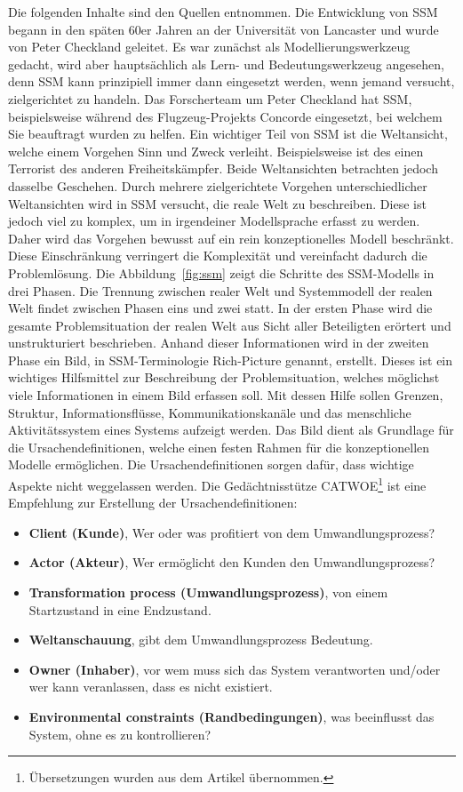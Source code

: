 \documentclass[11pt,a4paper]{report}
\begin{document}
Die folgenden Inhalte sind den Quellen \cite{checkland, bobwill, ssmger} entnommen. Die Entwicklung von SSM begann in den späten 60er Jahren an der Universität von Lancaster und wurde von Peter Checkland geleitet. Es war zunächst als Modellierungswerkzeug gedacht, wird aber hauptsächlich als Lern- und Bedeutungswerkzeug angesehen, denn SSM kann prinzipiell immer dann eingesetzt werden, wenn jemand versucht, zielgerichtet zu handeln. Das Forscherteam um Peter Checkland hat SSM, beispielsweise während des Flugzeug-Projekts Concorde eingesetzt, bei welchem Sie beauftragt wurden zu helfen. Ein wichtiger Teil von SSM ist die Weltansicht, welche einem Vorgehen Sinn und Zweck verleiht. Beispielsweise ist des einen Terrorist des anderen Freiheitskämpfer. Beide Weltansichten betrachten jedoch dasselbe Geschehen. Durch mehrere zielgerichtete Vorgehen unterschiedlicher Weltansichten wird in SSM versucht, die reale Welt zu beschreiben. Diese ist jedoch viel zu komplex, um in irgendeiner Modellsprache erfasst zu werden. Daher wird das Vorgehen bewusst auf ein rein konzeptionelles Modell beschränkt. Diese Einschränkung verringert die Komplexität und vereinfacht dadurch die Problemlösung. Die Abbildung~\ref{fig:ssm} zeigt die Schritte des SSM-Modells in drei Phasen. Die Trennung zwischen realer Welt und Systemmodell der realen Welt findet zwischen Phasen eins und zwei statt. In der ersten Phase wird die gesamte Problemsituation der realen Welt aus Sicht aller Beteiligten erörtert und unstrukturiert beschrieben. Anhand dieser Informationen wird in der zweiten Phase ein Bild, in SSM-Terminologie Rich-Picture genannt, erstellt. Dieses ist ein wichtiges Hilfsmittel zur Beschreibung der Problemsituation, welches möglichst viele Informationen in einem Bild erfassen soll. Mit dessen Hilfe sollen Grenzen, Struktur, Informationsflüsse, Kommunikationskanäle und das menschliche Aktivitätssystem eines Systems aufzeigt werden. Das Bild dient als Grundlage für die Ursachendefinitionen, welche einen festen Rahmen für die konzeptionellen Modelle ermöglichen. Die Ursachendefinitionen sorgen dafür, dass wichtige Aspekte nicht weggelassen werden. Die Gedächtnisstütze CATWOE\footnote{Übersetzungen wurden aus dem Artikel \cite{ssmger} übernommen.} ist eine Empfehlung zur Erstellung der Ursachendefinitionen:

\begin{itemize}[leftmargin=*]
\item \textbf{Client (Kunde)}, Wer oder was profitiert von dem Umwandlungsprozess?
\item \textbf{Actor (Akteur)}, Wer ermöglicht den Kunden den Umwandlungsprozess?
\item \textbf{Transformation process (Umwandlungsprozess)}, von einem Startzustand in eine Endzustand.
\item \textbf{Weltanschauung}, gibt dem Umwandlungsprozess Bedeutung.
\item \textbf{Owner (Inhaber)}, vor wem muss sich das System verantworten und/oder wer kann veranlassen, dass es nicht existiert.
\item \textbf{Environmental constraints (Randbedingungen)}, was beeinflusst das System, ohne es zu kontrollieren?
\end{itemize}
\end{document}
